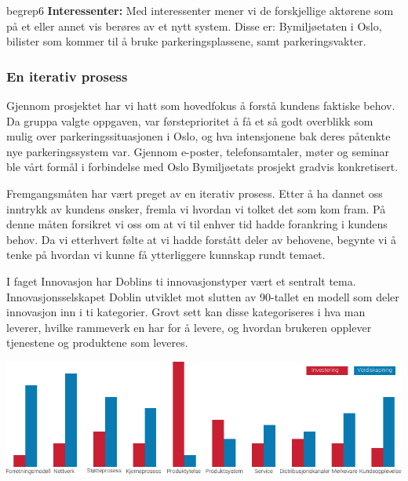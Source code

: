 \documentclass[xetex]{beamer}
\begin{document}
\begin{frame}
	\vspace{-1em}
	
	\hfill\begin{beamercolorbox}[wd=0.80\textwidth, ht=7.3ex, dp=5pt, leftskip=.3cm, rightskip=.3cm]{begrep6}
		\tiny
		\textbf{Interessenter:} Med interessenter mener vi de forskjellige aktørene som på et eller annet vis berøres av et nytt system. Disse er: Bymiljøetaten i Oslo, bilister som kommer til å bruke parkeringsplassene, samt parkeringsvakter.
	\end{beamercolorbox}

\end{frame}








\begin{frame}\label{fr:metodikk}
	\frametitle{En iterativ prosess}
	Gjennom prosjektet har vi hatt som hovedfokus å \alert{forstå} kundens faktiske \alert{behov}. Da gruppa 
valgte oppgaven, var førsteprioritet å få et så godt \alert{overblikk} som mulig over parkeringssituasjonen i Oslo, og hva intensjonene bak deres påtenkte nye parkeringssystem var. Gjennom e-poster, telefonsamtaler, møter og seminar ble vårt formål i forbindelse med Oslo Bymiljøetats prosjekt gradvis \alert{konkretisert}.

	Fremgangsmåten har vært preget av en \alert{iterativ} prosess. Etter å ha dannet oss inntrykk av kundens ønsker, fremla vi hvordan vi tolket det som kom fram. På denne måten forsikret vi oss om at vi til enhver tid hadde \alert{forankring} i kundens behov. Da vi etterhvert følte at vi hadde forstått deler av behovene, begynte vi å tenke på hvordan vi kunne få \alert{ytterliggere kunnskap} rundt temaet.
	
	I faget Innovasjon har \alert{Doblins ti innovasjonstyper} vært et sentralt tema. Innovasjonsselskapet Doblin utviklet mot slutten av 90-tallet en modell som deler innovasjon inn i ti kategorier. Grovt sett kan disse kategoriseres i hva man leverer, hvilke rammeverk en har for å levere, og hvordan brukeren opplever tjenestene og produktene som leveres.

	\bigskip
	\centerline{\includegraphics[scale=0.9]{grafikk/various/doblin.pdf}}
\end{frame}
\end{document}
